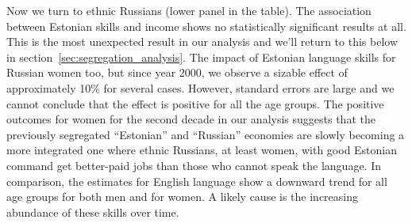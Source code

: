 \documentclass[12pt, a4paper]{article}
\begin{document}
Now we turn to ethnic Russians (lower panel in the table).  The association between Estonian skills and income shows no
statistically significant results at all.  This is the most unexpected
result in our analysis and we'll return to this
below in section~\ref{sec:segregation_analysis}.
The impact of Estonian language skills for Russian women too, but
since year 2000, we observe a sizable effect of approximately
10\% for several cases.  However, standard errors are large and we
cannot conclude that the effect is positive for all the age groups.
The positive outcomes for women for the second decade in our analysis
suggests that the previously segregated ``Estonian'' and ``Russian''
economies are slowly becoming a more integrated one where ethnic
Russians, at least women, with good Estonian command get better-paid
jobs than those who cannot speak the language.
In comparison, the estimates for English language show
a downward trend for all age groups for both men and for women.  A likely
cause is the increasing abundance of these skills over time.
\end{document}
